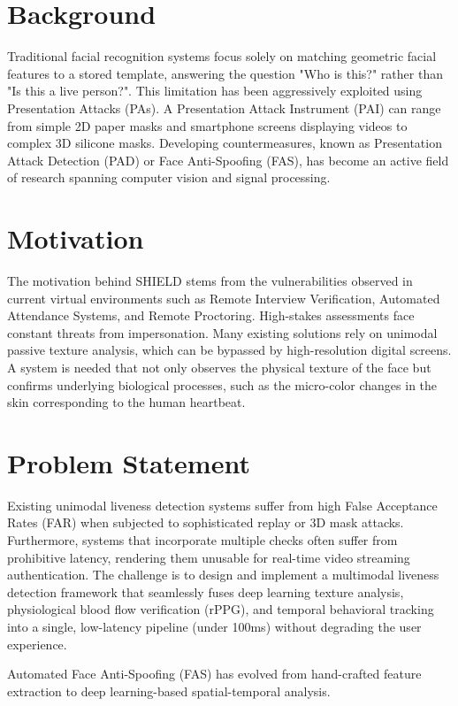 \documentclass[12pt, a4paper]{report}
\begin{document}
\section{Background}
Traditional facial recognition systems focus solely on matching geometric facial features to a stored template, answering the question "Who is this?" rather than "Is this a live person?". This limitation has been aggressively exploited using Presentation Attacks (PAs). A Presentation Attack Instrument (PAI) can range from simple 2D paper masks and smartphone screens displaying videos to complex 3D silicone masks. Developing countermeasures, known as Presentation Attack Detection (PAD) or Face Anti-Spoofing (FAS), has become an active field of research spanning computer vision and signal processing.

\section{Motivation}
The motivation behind SHIELD stems from the vulnerabilities observed in current virtual environments such as Remote Interview Verification, Automated Attendance Systems, and Remote Proctoring. High-stakes assessments face constant threats from impersonation. Many existing solutions rely on unimodal passive texture analysis, which can be bypassed by high-resolution digital screens. A system is needed that not only observes the physical texture of the face but confirms underlying biological processes, such as the micro-color changes in the skin corresponding to the human heartbeat.

\section{Problem Statement}
Existing unimodal liveness detection systems suffer from high False Acceptance Rates (FAR) when subjected to sophisticated replay or 3D mask attacks. Furthermore, systems that incorporate multiple checks often suffer from prohibitive latency, rendering them unusable for real-time video streaming authentication. The challenge is to design and implement a multimodal liveness detection framework that seamlessly fuses deep learning texture analysis, physiological blood flow verification (rPPG), and temporal behavioral tracking into a single, low-latency pipeline (under 100ms) without degrading the user experience.


\iffalse
Automated Face Anti-Spoofing (FAS) has evolved from hand-crafted feature extraction to deep learning-based spatial-temporal analysis. 
\end{document}
